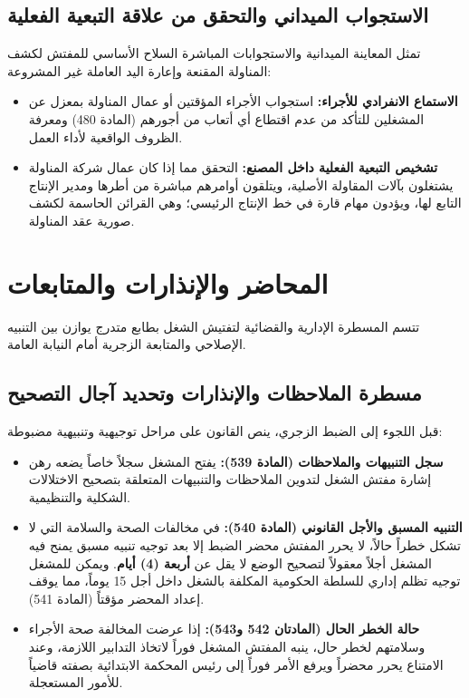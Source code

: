 \subsection{الاستجواب الميداني والتحقق من علاقة التبعية الفعلية}
تمثل المعاينة الميدانية والاستجوابات المباشرة السلاح الأساسي للمفتش لكشف المناولة المقنعة وإعارة اليد العاملة غير المشروعة:
\begin{itemize}[leftmargin=*, itemsep=5pt]
    \item \textbf{الاستماع الانفرادي للأجراء:} استجواب الأجراء المؤقتين أو عمال المناولة بمعزل عن المشغلين للتأكد من عدم اقتطاع أي أتعاب من أجورهم (المادة \textenglish{480}) ومعرفة الظروف الواقعية لأداء العمل.
    \item \textbf{تشخيص التبعية الفعلية داخل المصنع:} التحقق مما إذا كان عمال شركة المناولة يشتغلون بآلات المقاولة الأصلية، ويتلقون أوامرهم مباشرة من أطرها ومدير الإنتاج التابع لها، ويؤدون مهام قارة في خط الإنتاج الرئيسي؛ وهي القرائن الحاسمة لكشف صورية عقد المناولة.
\end{itemize}

\section{المحاضر والإنذارات والمتابعات}

تتسم المسطرة الإدارية والقضائية لتفتيش الشغل بطابع متدرج يوازن بين التنبيه الإصلاحي والمتابعة الزجرية أمام النيابة العامة.

\subsection{مسطرة الملاحظات والإنذارات وتحديد آجال التصحيح}
قبل اللجوء إلى الضبط الزجري، ينص القانون على مراحل توجيهية وتنبيهية مضبوطة:
\begin{itemize}[leftmargin=*, itemsep=5pt]
    \item \textbf{سجل التنبيهات والملاحظات (المادة \textenglish{539}):} يفتح المشغل سجلاً خاصاً يضعه رهن إشارة مفتش الشغل لتدوين الملاحظات والتنبيهات المتعلقة بتصحيح الاختلالات الشكلية والتنظيمية.
    \item \textbf{التنبيه المسبق والأجل القانوني (المادة \textenglish{540}):} في مخالفات الصحة والسلامة التي لا تشكل خطراً حالاً، لا يحرر المفتش محضر الضبط إلا بعد توجيه تنبيه مسبق يمنح فيه المشغل أجلاً معقولاً لتصحيح الوضع لا يقل عن \textbf{أربعة (\textenglish{4}) أيام}. ويمكن للمشغل توجيه تظلم إداري للسلطة الحكومية المكلفة بالشغل داخل أجل \textenglish{15} يوماً، مما يوقف إعداد المحضر مؤقتاً (المادة \textenglish{541}).
    \item \textbf{حالة الخطر الحال (المادتان \textenglish{542} و\textenglish{543}):} إذا عرضت المخالفة صحة الأجراء وسلامتهم لخطر حال، ينبه المفتش المشغل فوراً لاتخاذ التدابير اللازمة، وعند الامتناع يحرر محضراً ويرفع الأمر فوراً إلى رئيس المحكمة الابتدائية بصفته قاضياً للأمور المستعجلة.
\end{itemize}

